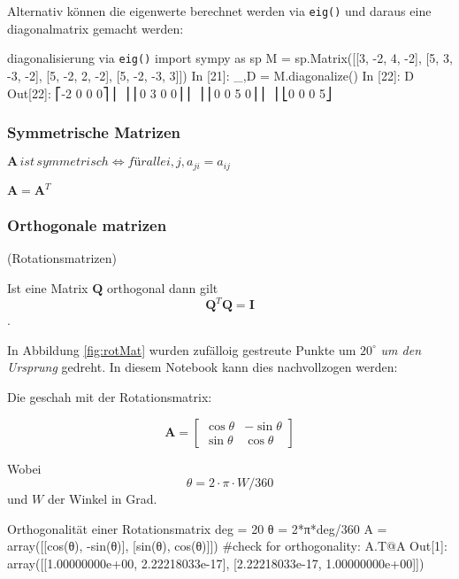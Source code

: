 Alternativ können die eigenwerte berechnet werden via \texttt{eig()} und daraus eine diagonalmatrix gemacht werden:
\begin{python}{diagonalisierung via \texttt{eig()}}
import sympy as sp  
M = sp.Matrix([[3, -2,  4, -2], 
               [5,  3, -3, -2], 
               [5, -2,  2, -2], 
               [5, -2, -3,  3]]) 
In [21]: _,D = M.diagonalize()
In [22]: D
Out[22]:
⎡-2  0  0  0⎤
⎢           ⎥
⎢0   3  0  0⎥
⎢           ⎥
⎢0   0  5  0⎥
⎢           ⎥
⎣0   0  0  5⎦
\end{python}


\subsubsection{Symmetrische Matrizen}

$\mathbf{A} \, ist \, symmetrisch \iff für alle i,j, a_{ji} = a_{ij}$

$\mathbf{A} = \mathbf{A}^T$



\subsubsection{Orthogonale matrizen}
(Rotationsmatrizen)

Ist eine Matrix $\mathbf{Q}$ orthogonal dann gilt 
$$ \mathbf{Q}^T\mathbf{Q} = \mathbf{I} $$.


In Abbildung \ref{fig:rotMat} wurden zufälloig gestreute Punkte um $20^\circ$ \emph{um den Ursprung} gedreht. In diesem Notebook kann dies nachvollzogen werden: 

Die geschah mit der Rotationsmatrix:


\begin{equation}
    {\displaystyle \mathbf{A}={\begin{bmatrix}\cos \theta &-\sin \theta \\\sin \theta &\cos \theta \end{bmatrix}}}
\end{equation}

Wobei $$\theta = 2\cdot \pi \cdot W / 360$$ und $W$ der Winkel in Grad.

\begin{python}{Orthogonalität einer Rotationsmatrix}
deg = 20
θ = 2*π*deg/360 
A = array([[cos(θ), -sin(θ)],
           [sin(θ), cos(θ)]])
#check for orthogonality:
A.T@A
Out[1]: array([[1.00000000e+00, 2.22218033e-17],
       [2.22218033e-17, 1.00000000e+00]])

\end{python}



